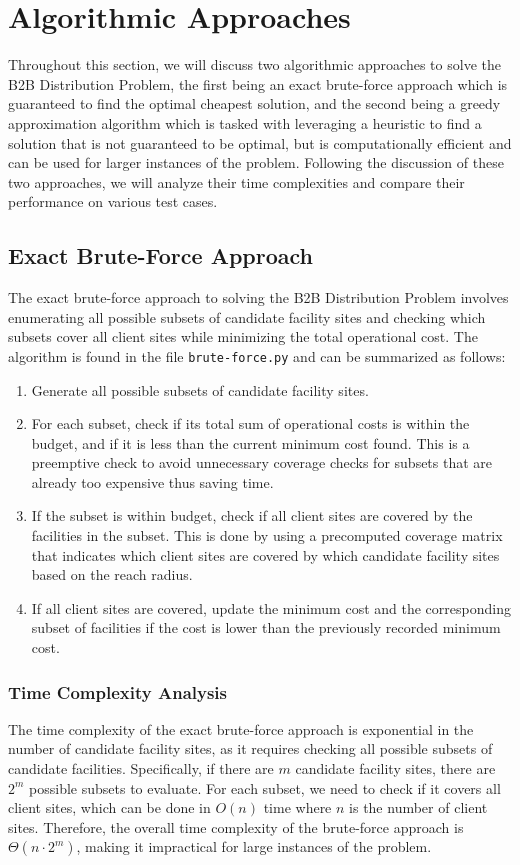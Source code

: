 \documentclass[letterpaper]{article}
\begin{document}
\section{Algorithmic Approaches}
Throughout this section, we will discuss two algorithmic approaches to solve the B2B Distribution Problem, the first being an exact brute-force approach which is guaranteed to find the optimal cheapest solution, and the second being a greedy approximation algorithm which is tasked with leveraging a heuristic to find a solution that is not guaranteed to be optimal, but is computationally efficient and can be used for larger instances of the problem. Following the discussion of these two approaches, we will analyze their time complexities and compare their performance on various test cases.

\subsection{Exact Brute-Force Approach}
The exact brute-force approach to solving the B2B Distribution Problem involves enumerating all possible subsets of candidate facility sites and checking which subsets cover all client sites while minimizing the total operational cost. The algorithm is found in the file \texttt{brute-force.py} and can be summarized as follows:

\begin{enumerate}[label=\textbf{Step \arabic*.}]
    \item Generate all possible subsets of candidate facility sites.
    \item For each subset, check if its total sum of operational costs is within the budget, and if it is less than the current minimum cost found. This is a preemptive check to avoid unnecessary coverage checks for subsets that are already too expensive thus saving time.
    \item If the subset is within budget, check if all client sites are covered by the facilities in the subset. This is done by using a precomputed coverage matrix that indicates which client sites are covered by which candidate facility sites based on the reach radius.
    \item If all client sites are covered, update the minimum cost and the corresponding subset of facilities if the cost is lower than the previously recorded minimum cost.
\end{enumerate}

\subsubsection{Time Complexity Analysis}
The time complexity of the exact brute-force approach is exponential in the number of candidate facility sites, as it requires checking all possible subsets of candidate facilities. Specifically, if there are $m$ candidate facility sites, there are $2^m$ possible subsets to evaluate. For each subset, we need to check if it covers all client sites, which can be done in $O(n)$ time where $n$ is the number of client sites. Therefore, the overall time complexity of the brute-force approach is $\Theta(n \cdot 2^m)$, making it impractical for large instances of the problem.
\end{document}
